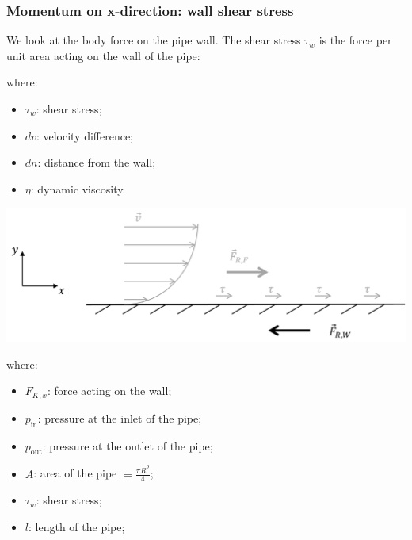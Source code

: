 \documentclass{article}
\begin{document}
\subsubsection{Momentum on x-direction: wall shear stress}
We look at the body force on the pipe wall. The shear stress $\tau_w$ is the
force per unit area acting on the wall of the pipe:

where:
\begin{itemize}
    \item $\tau_w$: shear stress;
    \item $dv$: velocity difference;
    \item $dn$: distance from the wall;
    \item $\eta$: dynamic viscosity.
\end{itemize}

\begin{center}
    \includegraphics[width=.8\textwidth]{media/Wandreibung.png}
\end{center}


where:

\begin{minipage}{0.45\textwidth}
\begin{itemize}
    \item $F_{K,x}$: force acting on the wall;
    \item $p_{\text{in}}$: pressure at the inlet of the pipe;
    \item $p_\text{out}$: pressure at the outlet of the pipe;
\end{itemize}
\end{minipage}
\hfill
\begin{minipage}{0.45\textwidth}
\begin{itemize}
    \item $A$: area of the pipe $= \frac{\pi R^2}{4}$;
    \item $\tau_w$: shear stress;
    \item $l$: length of the pipe;
\end{itemize}
\end{minipage}
\end{document}
